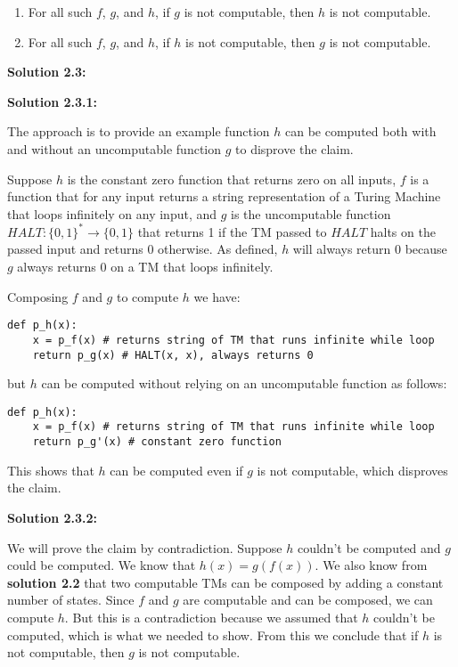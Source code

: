 \documentclass[11pt]{article}
\begin{document}
\begin{enumerate}
	\item For all such $f$, $g$, and $h$, if $g$ is not computable, then $h$ is not computable.
	\item For all such $f$, $g$, and $h$, if $h$ is not computable, then $g$ is not computable.
\end{enumerate}

\textbf{Solution 2.3:}

\textbf{Solution 2.3.1:}

The approach is to provide an example function $h$ can be computed both with and without an uncomputable function $g$ to disprove the claim.

Suppose $h$ is the constant zero function that returns zero on all inputs, $f$ is a function that for any input returns a string representation of a Turing Machine that loops infinitely on any input, and $g$ is the uncomputable function $HALT: \{0, 1\}^* \to \{0, 1\}$ that returns 1 if the TM passed to $HALT$ halts on the passed input and returns 0 otherwise. As defined, $h$ will always return 0 because $g$ always returns 0 on a TM that loops infinitely.

Composing $f$ and $g$ to compute $h$ we have:
\begin{lstlisting}
def p_h(x):
    x = p_f(x) # returns string of TM that runs infinite while loop
    return p_g(x) # HALT(x, x), always returns 0
\end{lstlisting}

but $h$ can be computed without relying on an uncomputable function as follows:

\begin{lstlisting}
def p_h(x):
    x = p_f(x) # returns string of TM that runs infinite while loop
    return p_g'(x) # constant zero function 
\end{lstlisting}

This shows that $h$ can be computed even if $g$ is not computable, which disproves the claim.

\newpage

\textbf{Solution 2.3.2:} 

We will prove the claim by contradiction. Suppose $h$ couldn't be computed and $g$ could be computed. We know that $h(x) = g(f(x))$. We also know from \textbf{solution 2.2} that two computable TMs can be composed by adding a constant number of states. Since $f$ and $g$ are computable and can be composed, we can compute $h$. But this is a contradiction because we assumed that $h$ couldn't be computed, which is what we needed to show. From this we conclude that if $h$ is not computable, then $g$ is not computable.
\end{document}
